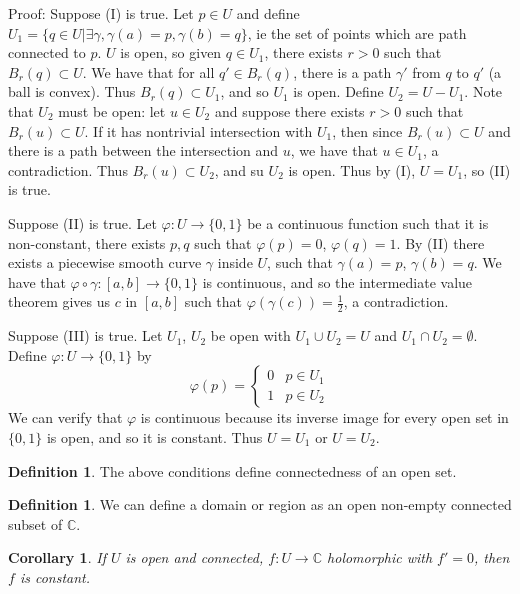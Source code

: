 \documentclass[11pt]{article}
\theoremstyle{plain}
\newtheorem{corollary}[theorem]{Corollary}
\theoremstyle{definition}
\newtheorem{definition}[theorem]{Definition}
\newcommand{\C}{\mathbb{C}}
\begin{document}
Proof: Suppose (I) is true. Let $p \in U$ and define $U_1 = \{ q \in U | \exists \gamma, \gamma(a) = p, \gamma(b) = q\}$, ie the set of points which are path connected to $p$. $U$ is open, so given $q \in U_1$, there exists $r>0$ such that $B_r(q) \subset U$. We have that for all $q' \in B_r(q)$, there is a path $\gamma'$ from $q$ to $q'$ (a ball is convex). Thus $B_r(q) \subset U_1$, and so $U_1$ is open. Define $U_2 = U - U_1$. Note that $U_2$ must be open: let $u \in U_2$ and suppose there exists $r >0$ such that $B_r(u) \subset U$. If it has nontrivial intersection with $U_1$, then since $B_r(u) \subset U$ and there is a path between the intersection and $u$, we have that $u \in U_1$, a contradiction. Thus $B_r(u) \subset U_2$, and su $U_2$ is open. Thus by (I), $U = U_1$, so (II) is true.

Suppose (II) is true. Let $\varphi:U \to \{0, 1\}$ be a continuous function such that it is non-constant, there exists $p,q$ such that $\varphi(p) = 0$, $\varphi(q) = 1$. By (II) there exists a piecewise smooth curve $\gamma$ inside $U$, such that $\gamma(a) = p$, $\gamma(b) = q$. We have that $\varphi \circ \gamma: [a,b] \to \{0, 1\}$ is continuous, and so the intermediate value theorem gives us $c$ in $[a,b]$ such that $\varphi(\gamma(c)) = \frac{1}{2}$, a contradiction.

Suppose (III) is true. Let $U_1$, $U_2$ be open with $U_1 \cup U_2 = U$ and $U_1 \cap U_2 = \emptyset$. Define $\varphi:U \to \{0,1\}$ by 
$$ \varphi(p) = \begin{cases} 0 & p \in U_1 \\ 1 & p \in U_2 \end{cases} $$
We can verify that $\varphi$ is continuous because its inverse image for every open set in $\{0,1\}$ is open, and so it is constant. Thus $U = U_1$ or $U = U_2$. 

\begin{definition}
The above conditions define connectedness of an open set.
\end{definition}

\begin{definition}
We can define a domain or region as an open non-empty connected subset of $\C$.
\end{definition}

\begin{corollary}
If $U$ is open and connected, $f: U\to\C$ holomorphic with $f' = 0$, then $f$ is constant.
\end{corollary}
\end{document}

